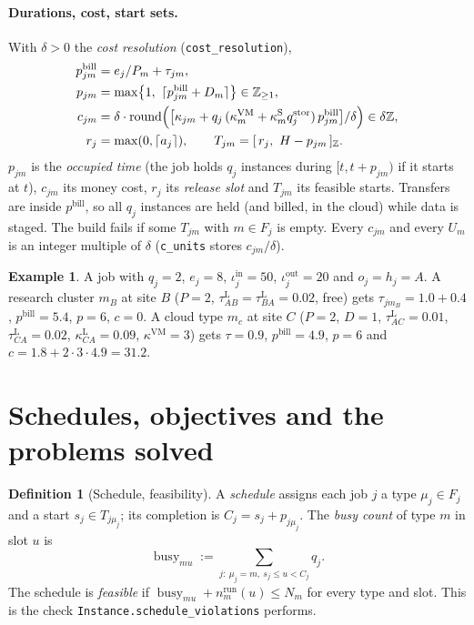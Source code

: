 \documentclass[11pt,a4paper]{article}
\theoremstyle{definition}
\newtheorem{definition}[theorem]{Definition}
\newtheorem{example}[theorem]{Example}
\theoremstyle{remark}
\newcommand{\Z}{\mathbb{Z}}
\newcommand{\code}[1]{\texttt{#1}}
\newcommand{\busy}{\operatorname{busy}}
\newcommand{\nrun}{n^{\mathrm{run}}}
\newcommand{\pin}{\mathrm{in}}
\newcommand{\pout}{\mathrm{out}}
\begin{document}
\paragraph{Durations, cost, start sets.} With $\delta>0$ the \emph{cost
resolution} (\code{cost\_resolution}),
\begin{align}
p^{\mathrm{bill}}_{jm}&=e_j/P_m+\tau_{jm}, \label{eq:pbill}\\
p_{jm}&=\max\bigl\{1,\ \lceil p^{\mathrm{bill}}_{jm}+D_m\rceil\bigr\}\in\Z_{\ge1}, \label{eq:p}\\
c_{jm}&=\delta\cdot\operatorname{round}\Bigl(\bigl[\kappa_{jm}+q_j\,(\kappa^{\mathrm{VM}}_m+\kappa^{\mathrm S}_mq^{\mathrm{stor}}_j)\,p^{\mathrm{bill}}_{jm}\bigr]/\delta\Bigr)\in\delta\Z, \label{eq:c}\\
r_j&=\max(0,\lceil a_j\rceil),\qquad T_{jm}=[\,r_j,\ H-p_{jm}\,]_\Z. \label{eq:T}
\end{align}
$p_{jm}$ is the \emph{occupied time} (the job holds $q_j$ instances during
$[t,t+p_{jm})$ if it starts at $t$), $c_{jm}$ its money cost, $r_j$ its
\emph{release slot} and $T_{jm}$ its feasible starts. Transfers are inside
$p^{\mathrm{bill}}$, so all $q_j$ instances are held (and billed, in the cloud)
while data is staged. The build fails if some $T_{jm}$ with $m\in F_j$ is
empty. Every $c_{jm}$ and every $U_m$ is an integer multiple of $\delta$
(\code{c\_units} stores $c_{jm}/\delta$).

\begin{example}
A job with $q_j=2$, $e_j=8$, $\iota^\pin_j=50$, $\iota^\pout_j=20$ and
$o_j=h_j=A$. A research cluster $m_B$ at site $B$ ($P=2$,
$\tau^{\mathrm L}_{AB}=\tau^{\mathrm L}_{BA}=0.02$, free) gets
$\tau_{jm_B}=1.0+0.4$, $p^{\mathrm{bill}}=5.4$, $p=6$, $c=0$. A cloud type $m_c$
at site $C$ ($P=2$, $D=1$, $\tau^{\mathrm L}_{AC}=0.01$,
$\tau^{\mathrm L}_{CA}=0.02$, $\kappa^{\mathrm L}_{CA}=0.09$,
$\kappa^{\mathrm{VM}}=3$) gets $\tau=0.9$, $p^{\mathrm{bill}}=4.9$, $p=6$ and
$c=1.8+2\cdot3\cdot4.9=31.2$.
\end{example}

\section{Schedules, objectives and the problems solved}\label{sec:problem}

\begin{definition}[Schedule, feasibility]\label{def:schedule}
A \emph{schedule} assigns each job $j$ a type $\mu_j\in F_j$ and a start
$s_j\in T_{j\mu_j}$; its completion is $C_j=s_j+p_{j\mu_j}$. The \emph{busy
count} of type $m$ in slot $u$ is
\[
\busy_{mu}:=\sum_{j:\ \mu_j=m,\ s_j\le u<C_j} q_j .
\]
The schedule is \emph{feasible} if $\busy_{mu}+\nrun_m(u)\le N_m$ for every
type and slot. This is the check \code{Instance.\allowbreak schedule\_\allowbreak violations}
performs.
\end{definition}
\end{document}
